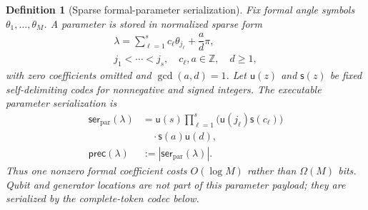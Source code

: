 \documentclass[aps,prx,reprint,floatfix,superscriptaddress]{revtex4-2}
\newtheorem{definition}{Definition}
\newcommand{\pcharge}{\mathsf{prec}}
\begin{document}
\begin{definition}[Sparse formal-parameter serialization]
\label{def:parmodule}
Fix formal angle symbols $\theta_1,\ldots,\theta_M$.  A parameter is stored
in normalized sparse form
\begin{equation*}
\begin{gathered}
 \lambda=\displaystyle\sum_{\ell=1}^{s}c_\ell\theta_{j_\ell}
 +\dfrac{a}{d}\pi,\\
 j_1<\cdots<j_s,\quad c_\ell,a\in\mathbb Z,\quad d\geq1,
\end{gathered}
\end{equation*}
with zero coefficients omitted and $\gcd(a,d)=1$.  Let
$\mathsf{u}(z)$ and $\mathsf{s}(z)$ be fixed self-delimiting codes for
nonnegative and signed integers.  The executable parameter serialization is
\begin{equation}
\label{eq:precision-charge}
\begin{aligned}
 \mathsf{ser}_{\mathrm{par}}(\lambda)
 &=\mathsf{u}(s)\prod_{\ell=1}^{s}
   \bigl(\mathsf{u}(j_\ell)\mathsf{s}(c_\ell)\bigr)\\
 &\quad\cdot\mathsf{s}(a)\mathsf{u}(d),\\
 \pcharge(\lambda)&:=|\mathsf{ser}_{\mathrm{par}}(\lambda)|.
\end{aligned}
\end{equation}
Thus one nonzero formal coefficient costs $O(\log M)$ rather than
$\Omega(M)$ bits.  Qubit and generator locations are not part of this
parameter payload; they are serialized by the complete-token codec below.
\end{definition}
\end{document}
